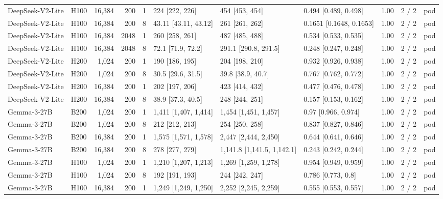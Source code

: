 \begin{landscape}
\begin{longtable}{llrrrlllrll}
DeepSeek-V2-Lite & H100 & 16,384 & 200 & 1 & 224 {[}222, 226{]} & 454 {[}453, 454{]} & 0.494 {[}0.489, 0.498{]} & 1.00 & 2 / 2 & pod \\
DeepSeek-V2-Lite & H100 & 16,384 & 200 & 8 & 43.11 {[}43.11, 43.12{]} & 261 {[}261, 262{]} & 0.1651 {[}0.1648, 0.1653{]} & 1.00 & 2 / 2 & pod \\
DeepSeek-V2-Lite & H100 & 16,384 & 2048 & 1 & 260 {[}258, 261{]} & 487 {[}485, 488{]} & 0.534 {[}0.533, 0.535{]} & 1.00 & 2 / 2 & pod \\
DeepSeek-V2-Lite & H100 & 16,384 & 2048 & 8 & 72.1 {[}71.9, 72.2{]} & 291.1 {[}290.8, 291.5{]} & 0.248 {[}0.247, 0.248{]} & 1.00 & 2 / 2 & pod \\
DeepSeek-V2-Lite & H200 & 1,024 & 200 & 1 & 190 {[}186, 195{]} & 204 {[}198, 210{]} & 0.932 {[}0.926, 0.938{]} & 1.00 & 2 / 2 & pod \\
DeepSeek-V2-Lite & H200 & 1,024 & 200 & 8 & 30.5 {[}29.6, 31.5{]} & 39.8 {[}38.9, 40.7{]} & 0.767 {[}0.762, 0.772{]} & 1.00 & 2 / 2 & pod \\
DeepSeek-V2-Lite & H200 & 16,384 & 200 & 1 & 202 {[}197, 206{]} & 423 {[}414, 432{]} & 0.477 {[}0.476, 0.478{]} & 1.00 & 2 / 2 & pod \\
DeepSeek-V2-Lite & H200 & 16,384 & 200 & 8 & 38.9 {[}37.3, 40.5{]} & 248 {[}244, 251{]} & 0.157 {[}0.153, 0.162{]} & 1.00 & 2 / 2 & pod \\
Gemma-3-27B & B200 & 1,024 & 200 & 1 & 1,411 {[}1,407, 1,414{]} & 1,454 {[}1,451, 1,457{]} & 0.97 {[}0.966, 0.974{]} & 1.00 & 2 / 2 & pod \\
Gemma-3-27B & B200 & 1,024 & 200 & 8 & 212 {[}212, 213{]} & 254 {[}250, 258{]} & 0.837 {[}0.827, 0.846{]} & 1.00 & 2 / 2 & pod \\
Gemma-3-27B & B200 & 16,384 & 200 & 1 & 1,575 {[}1,571, 1,578{]} & 2,447 {[}2,444, 2,450{]} & 0.644 {[}0.641, 0.646{]} & 1.00 & 2 / 2 & pod \\
Gemma-3-27B & B200 & 16,384 & 200 & 8 & 278 {[}277, 279{]} & 1,141.8 {[}1,141.5, 1,142.1{]} & 0.243 {[}0.242, 0.244{]} & 1.00 & 2 / 2 & pod \\
Gemma-3-27B & H100 & 1,024 & 200 & 1 & 1,210 {[}1,207, 1,213{]} & 1,269 {[}1,259, 1,278{]} & 0.954 {[}0.949, 0.959{]} & 1.00 & 2 / 2 & pod \\
Gemma-3-27B & H100 & 1,024 & 200 & 8 & 192 {[}191, 193{]} & 244 {[}242, 247{]} & 0.786 {[}0.773, 0.8{]} & 1.00 & 2 / 2 & pod \\
Gemma-3-27B & H100 & 16,384 & 200 & 1 & 1,249 {[}1,249, 1,250{]} & 2,252 {[}2,245, 2,259{]} & 0.555 {[}0.553, 0.557{]} & 1.00 & 2 / 2 & pod \\

\end{longtable}
\end{landscape}
